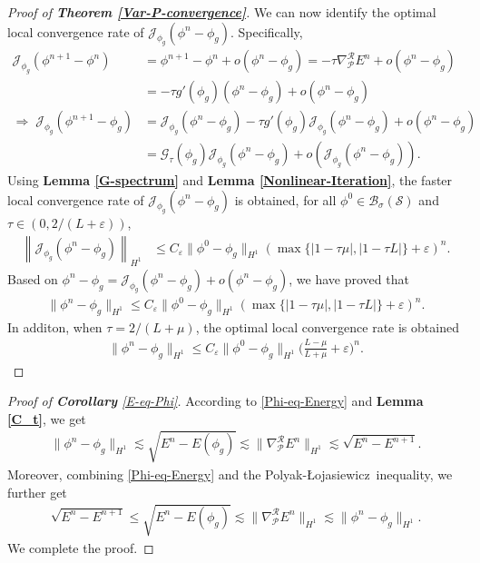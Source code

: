 \documentclass[preprint,3p]{elsarticle}
\begin{document}
\begin{proof}[Proof of {\bf Theorem \ref{Var-P-convergence}}]
	We can now identify the optimal local convergence rate of $\mathcal{J}_{\phi_g}(\phi^{n}-\phi_g)$. Specifically,
	\begin{align*}
		\mathcal{J}_{\phi_g}(\phi^{n+1}-\phi^n)&=\phi^{n+1}-\phi^n+o\left(\phi^{n}-\phi_g\right)=-\tau\nabla_{\mathcal{P}}^{\mathcal{R}}E^n+o\left(\phi^{n}-\phi_g\right)\\
		&=-\tau g'(\phi_g)(\phi^{n}-\phi_g)+o\left(\phi^{n}-\phi_g\right)\\
		\Longrightarrow\;\mathcal{J}_{\phi_g}(\phi^{n+1}-\phi_g)&=\mathcal{J}_{\phi_g}(\phi^{n}-\phi_g)-\tau g'(\phi_g)\mathcal{J}_{\phi_g}(\phi^{n}-\phi_g)+o\left(\phi^{n}-\phi_g\right)\\
		&=\mathcal{G}_{\tau}(\phi_g)\mathcal{J}_{\phi_g}(\phi^{n}-\phi_g)+o\left(\mathcal{J}_{\phi_g}(\phi^{n}-\phi_g)\right).
	\end{align*}
	Using {\bf Lemma \ref{G-spectrum}} and {\bf Lemma \ref{Nonlinear-Iteration}}, the faster local convergence rate of $\mathcal{J}_{\phi_g}(\phi^{n}-\phi_g)$ is obtained, for all $\phi^0\in\mathcal{B}_{\sigma}(\mathcal{S})$ and $\tau\in(0,2/(L+\varepsilon))$,
	\begin{align*}
		\left\|\mathcal{J}_{\phi_g}(\phi^{n}-\phi_g)\right\|_{H^1}&\le C_{\varepsilon}\|\phi^0-\phi_g\|_{H^1}\left(\max\big\{|1-\tau\mu|,|1-\tau L|\big\}+\varepsilon\right)^{n}.
	\end{align*}
	Based on $\phi^n-\phi_g=\mathcal{J}_{\phi_g}(\phi^n-\phi_g)+o(\phi^n-\phi_g)$, we have proved that
	\begin{align*}
		\|\phi^n-\phi_g\|_{H^1}\le C_{\varepsilon}\|\phi^0-\phi_g\|_{H^1}\left(\max\big\{|1-\tau\mu|,|1-\tau L|\big\}+\varepsilon\right)^{n}.
	\end{align*}
	In additon, when $\tau=2/(L+\mu)$, the optimal local convergence rate is obtained
	\begin{align*}
		\|\phi^n-\phi_g\|_{H^1}\le C_{\varepsilon}\|\phi^0-\phi_g\|_{H^1}\Bigg(\frac{L-\mu}{L+\mu}+\varepsilon\Bigg)^{n}.
	\end{align*}
\end{proof}
\begin{proof}[Proof of {\bf Corollary} \ref{E-eq-Phi}]
	According to \eqref{Phi-eq-Energy} and {\bf Lemma \ref{C_t}}, we get {
	\begin{align*}
		\|\phi^n-\phi_g\|_{H^1}\lesssim \sqrt{E^{n}-E(\phi_g)}\lesssim \|\nabla_{\mathcal{P}}^{\mathcal{R}}E^n\|_{H^1}\lesssim   \sqrt{E^{n}-E^{n+1}}.
	\end{align*}}
	Moreover, combining \eqref{Phi-eq-Energy} and the Polyak-\L ojasiewicz\ inequality, we further get {
	\begin{align*}
		\sqrt{E^{n}-E^{n+1}}\le\sqrt{E^{n}-E(\phi_g)}\lesssim \|\nabla_{\mathcal{P}}^{\mathcal{R}}E^n\|_{H^1}\lesssim \|\phi^n-\phi_g\|_{H^1}.
	\end{align*}}
	We complete the proof.
\end{proof}
\end{document}
